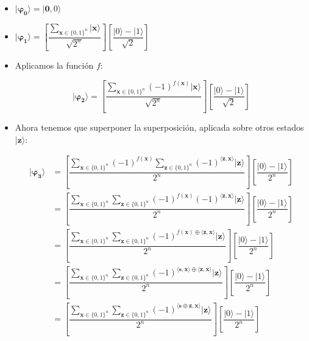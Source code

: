  \begin{itemize}
     \item $\mathbf{|\varphi_{0}\rangle} = |\mathbf{0},0\rangle$

    \vspace{5pt}

    \item  $\mathbf{|\varphi_{1}\rangle} = \left[ \dfrac{\sum_{\mathbf{x} \in \{0,1\}^{n}}|\mathbf{x}\rangle}{\sqrt{2^{n}}}\right] \left[ \dfrac{|0\rangle - |1\rangle}{\sqrt{2}}\right]$

    \vspace{5pt}

    \item Aplicamos la función $f$:
    
    \begin{equation} \label{eq:BV:phi2}
    \mathbf{|\varphi_{2}\rangle} =\left[ \dfrac{\sum_{\mathbf{x} \in \{0,1\}^{n}}(-1)^{f(\mathbf{x})}|\mathbf{x}\rangle}{\sqrt{2^{n}}}\right] \left[ \dfrac{|0\rangle - |1\rangle}{\sqrt{2}}\right]\end{equation}

    \vspace{5pt}

    \item Ahora tenemos que superponer la superposición, aplicada sobre otros estados $|\mathbf{z}\rangle$:

    \begin{equation}\label{eq:BV:phi3}
        \begin{split}\mathbf{|\varphi_{3}\rangle} &= \left[ \dfrac{\sum_{\mathbf{x} \in \{0,1\}^{n}}(-1)^{f(\mathbf{x})}\sum_{\mathbf{z} \in \{0,1\}^{n}}(-1)^{\langle\mathbf{z},\mathbf{x}\rangle}|\mathbf{z}\rangle}{2^{n}}\right] \left[ \dfrac{|0\rangle - |1\rangle}{2^{n}}\right] \\ &= \left[ \dfrac{\sum_{\mathbf{x} \in \{0,1\}^{n}}\sum_{\mathbf{z} \in \{0,1\}^{n}}(-1)^{f(\mathbf{x})}(-1)^{\langle\mathbf{z},\mathbf{x}\rangle}|\mathbf{z}\rangle}{2^{n}}\right] \left[ \dfrac{|0\rangle - |1\rangle}{2^{n}}\right] \\ &= \left[ \dfrac{\sum_{\mathbf{x} \in \{0,1\}^{n}}\sum_{\mathbf{z} \in \{0,1\}^{n}}(-1)^{f(\mathbf{x})\oplus\langle\mathbf{z},\mathbf{x}\rangle}|\mathbf{z}\rangle}{2^{n}}\right] \left[ \dfrac{|0\rangle - |1\rangle}{2^{n}}\right] \\  &= \left[ \dfrac{\sum_{\mathbf{x} \in \{0,1\}^{n}}\sum_{\mathbf{z} \in \{0,1\}^{n}}(-1)^{\langle\mathbf{s},\mathbf{x}\rangle\oplus\langle\mathbf{z},\mathbf{x}\rangle}|\mathbf{z}\rangle}{2^{n}}\right] \left[ \dfrac{|0\rangle - |1\rangle}{2^{n}}\right] \\ &= \left[ \dfrac{\sum_{\mathbf{x} \in \{0,1\}^{n}}\sum_{\mathbf{z} \in \{0,1\}^{n}}(-1)^{\langle\mathbf{s}\oplus \mathbf{z},\mathbf{x}\rangle}|\mathbf{z}\rangle}{2^{n}}\right] \left[ \dfrac{|0\rangle - |1\rangle}{2^{n}}\right] \\
        \end{split}
    \end{equation}
 \end{itemize}

